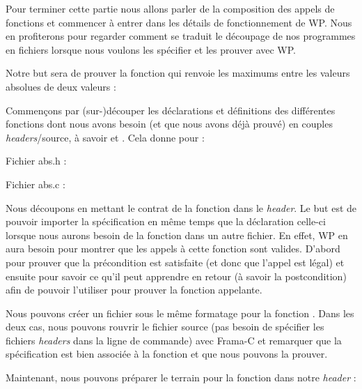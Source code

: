 Pour terminer cette partie nous allons parler de la composition des appels de
fonctions et commencer à entrer dans les détails de fonctionnement de WP. Nous
en profiterons pour regarder comment se traduit le découpage de nos
programmes en fichiers lorsque nous voulons les spécifier et les prouver avec WP.



Notre but sera de prouver la fonction  qui renvoie les maximums
entre les valeurs absolues de deux valeurs :






Commençons par (sur-)découper les déclarations et définitions des différentes
fonctions dont nous avons besoin (et que nous avons déjà prouvé) en couples
\textit{headers}/source, à savoir  et . Cela donne
pour  :



Fichier abs.h :



Fichier abs.c :




Nous découpons en mettant le contrat de la fonction dans le \textit{header}. Le
but est de pouvoir importer la spécification en même temps que la déclaration
celle-ci lorsque nous aurons besoin de la fonction dans un autre fichier. En
effet, WP en aura besoin pour montrer que les appels à cette
fonction sont valides. D'abord pour prouver que la précondition est satisfaite
(et donc que l'appel est légal) et ensuite pour savoir ce qu'il peut apprendre
en retour (à savoir la postcondition) afin de pouvoir l'utiliser pour prouver
la fonction appelante.



Nous pouvons créer un fichier sous le même formatage pour la fonction .
Dans les deux cas, nous pouvons rouvrir le fichier source (pas besoin de
spécifier les fichiers \textit{headers} dans la ligne de commande) avec Frama-C et
remarquer que la spécification est bien associée à la fonction et que nous
pouvons la prouver.



Maintenant, nous pouvons préparer le terrain pour la fonction  dans notre \textit{header} :




